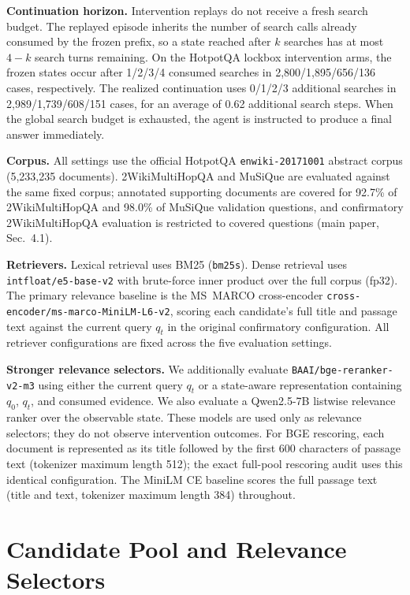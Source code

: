 \documentclass[10pt]{article}
\newcommand{\stitle}[1]{\vspace{0.4em}\noindent\textbf{#1}\hspace{0.6em}}
\begin{document}
\stitle{Continuation horizon.}
Intervention replays do not receive a fresh search budget. The replayed
episode inherits the number of search calls already consumed by the frozen
prefix, so a state reached after $k$ searches has at most $4-k$ search turns
remaining. On the HotpotQA lockbox intervention arms, the frozen states occur
after 1/2/3/4 consumed searches in 2{,}800/1{,}895/656/136 cases,
respectively. The realized continuation uses 0/1/2/3 additional searches in
2{,}989/1{,}739/608/151 cases, for an average of 0.62 additional search steps.
When the global search budget is exhausted, the agent is instructed to
produce a final answer immediately.

\stitle{Corpus.}
All settings use the official HotpotQA \texttt{enwiki-20171001} abstract
corpus (5{,}233{,}235 documents).
2WikiMultiHopQA and MuSiQue are evaluated against the same fixed corpus;
annotated supporting documents are covered for 92.7\% of 2WikiMultiHopQA and
98.0\% of MuSiQue validation questions, and confirmatory 2WikiMultiHopQA
evaluation is restricted to covered questions (main paper, Sec.~4.1).

\stitle{Retrievers.}
Lexical retrieval uses BM25 (\texttt{bm25s}).
Dense retrieval uses \texttt{intfloat/e5-base-v2} with brute-force inner
product over the full corpus (fp32).
The primary relevance baseline is the MS~MARCO cross-encoder
\texttt{cross-encoder/}\allowbreak\texttt{ms-marco-MiniLM-L6-v2},
scoring each candidate's full title and passage text against the current
query $q_t$ in the original confirmatory configuration.
All retriever configurations are fixed across the five evaluation settings.

\stitle{Stronger relevance selectors.}
We additionally evaluate \texttt{BAAI/bge-reranker-v2-m3} using either the
current query $q_t$ or a state-aware representation containing $q_0$, $q_t$,
and consumed evidence. We also evaluate a Qwen2.5-7B listwise relevance
ranker over the observable state. These models are used only as relevance
selectors; they do not observe intervention outcomes. For BGE rescoring, each
document is represented as its title followed by the first 600 characters of
passage text (tokenizer maximum length 512); the exact full-pool rescoring
audit uses this identical configuration. The MiniLM CE baseline scores the
full passage text (title and text, tokenizer maximum length 384) throughout.

\section{Candidate Pool and Relevance Selectors}
\label{sec:candidates}
\end{document}
